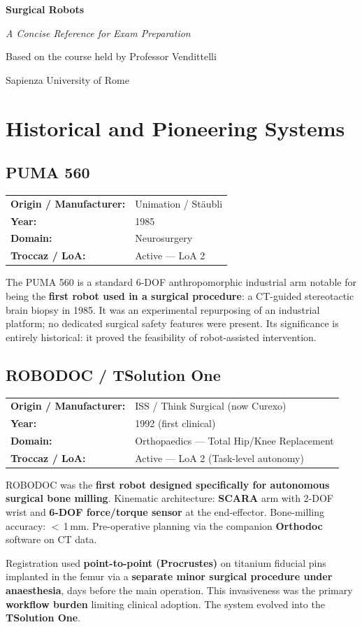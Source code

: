 \documentclass[11pt,a4paper,twoside]{report}
\makeatletter
\newcommand{\robotmeta}[4]{%
  \noindent\begin{tabular}{@{}ll@{}}
    \textbf{Origin / Manufacturer:} & #1 \\
    \textbf{Year:}                  & #2 \\
    \textbf{Domain:}                & #3 \\
    \textbf{Troccaz / LoA:}         & #4 \\
  \end{tabular}\par\smallskip\noindent}
\makeatother
\begin{document}
\begin{titlepage}
  \centering\vspace*{2cm}
  {\fontsize{34}{40}\selectfont\bfseries Surgical Robots\par}\vspace{1cm}
  {\Large\itshape A Concise Reference for Exam Preparation\par}\vspace{1cm}
  {\large Based on the course held by Professor Vendittelli\par}
  {\large Sapienza University of Rome\par}\vfill
\end{titlepage}

\tableofcontents\newpage

\chapter{Historical and Pioneering Systems}

\section{PUMA 560}
\robotmeta{Unimation / Stäubli}{1985}{Neurosurgery}{Active — LoA 2}
The PUMA 560 is a standard 6-DOF anthropomorphic industrial arm notable for being the \textbf{first robot used in a surgical procedure}: a CT-guided stereotactic brain biopsy in 1985. It was an experimental repurposing of an industrial platform; no dedicated surgical safety features were present. Its significance is entirely historical: it proved the feasibility of robot-assisted intervention.

\section{ROBODOC / TSolution One}
\robotmeta{ISS / Think Surgical (now Curexo)}{1992 (first clinical)}{Orthopaedics — Total Hip/Knee Replacement}{Active — LoA 2 (Task-level autonomy)}
ROBODOC was the \textbf{first robot designed specifically for autonomous surgical bone milling}. Kinematic architecture: \textbf{SCARA} arm with 2-DOF wrist and \textbf{6-DOF force/torque sensor} at the end-effector. Bone-milling accuracy: $<$\,1\,mm. Pre-operative planning via the companion \textbf{Orthodoc} software on CT data.

Registration used \textbf{point-to-point (Procrustes)} on titanium fiducial pins implanted in the femur via a \textbf{separate minor surgical procedure under anaesthesia}, days before the main operation. This invasiveness was the primary \textbf{workflow burden} limiting clinical adoption. The system evolved into the \textbf{TSolution One}.
\end{document}
